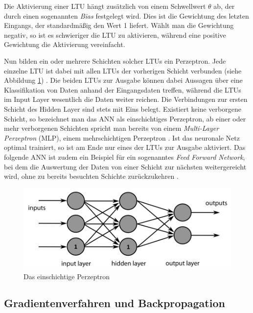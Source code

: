 Die Aktivierung einer LTU hängt zusätzlich von einem Schwellwert $\theta$ ab, der durch einen sogenannten \textit{Bias} festgelegt wird. Dies ist die Gewichtung des letzten Eingangs, der standardmäßig den Wert 1 liefert. Wählt man die Gewichtung negativ, so ist es schwieriger die LTU zu aktivieren, während eine positive Gewichtung die Aktivierung vereinfacht. \cite[S. 258]{AurelienGeron.2018}

Nun bilden ein oder mehrere Schichten solcher LTUs ein Perzeptron. Jede einzelne LTU ist dabei mit allen LTUs der vorherigen Schicht verbunden (siehe Abbildung \ref{neural_network}) \cite[S. 258 f.]{AurelienGeron.2018}. Die beiden LTUs zur Ausgabe können dabei Aussagen über eine Klassifikation von Daten anhand der Eingangsdaten treffen, während die LTUs im Input Layer wesentlich die Daten weiter reichen. Die Verbindungen zur ersten Schicht des Hidden Layer sind stets mit Eins belegt. Existiert keine verborgene Schicht, so bezeichnet man das ANN als einschichtiges Perzeptron, ab einer oder mehr verborgenen Schichten spricht man bereits von einem \textit{Multi-Layer Perzeptron} (MLP), einem mehrschichtigen Perzeptron \cite[S. 261 f.]{AurelienGeron.2018}. Ist das neuronale Netz optimal trainiert, so ist am Ende nur eines der LTUs zur Ausgabe aktiviert. Das folgende ANN ist zudem ein Beispiel für ein sogenanntes \textit{Feed Forward Network}, bei dem die Auswertung der Daten von einer Schicht zur nächsten weitergereicht wird, ohne zu bereits besuchten Schichte zurückzukehren \cite[S. 263]{AurelienGeron.2018}.

\begin{figure}[ht]
	\begin{center}
		\includegraphics[width=12cm]{Bilder/neural_network.png} 
		\caption[Das einschichtige Perzeptron]{Das einschichtige Perzeptron \cite{Wikipedia.20190123}}
		\label{neural_network}
	\end{center}
\end{figure}

\subsection*{Gradientenverfahren und Backpropagation}

